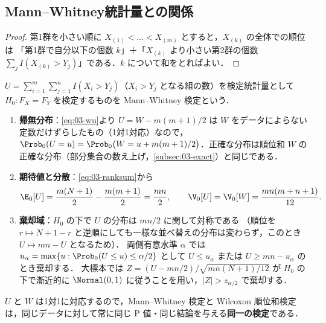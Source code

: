 \subsection{Mann--Whitney統計量との関係}\label{subsec:03-mw}
\begin{proof}
第1群を小さい順に $X_{(1)}<\dots<X_{(m)}$ とすると，$X_{(k)}$ の全体での順位は
「第1群で自分以下の個数 $k$」＋「$X_{(k)}$ より小さい第2群の個数 $\sum_jI(X_{(k)}>Y_j)$」である．$k$ について和をとればよい．
\end{proof}
\begin{teigi}\label{def:03-mwtest}
$U=\sum_{i=1}^m\sum_{j=1}^nI(X_i>Y_j)$（$X_i>Y_j$ となる組の数）を検定統計量として $H_0:F_X=F_Y$ を検定するものを Mann--Whitney 検定という．
\begin{enumerate}[label=(\roman*)]
\item \textbf{帰無分布}：\cref{eq:03-wu}より $U=W-m(m+1)/2$ は $W$ をデータによらない定数だけずらしたもの（1対1対応）なので，
      $\Prob_0(U=u)=\Prob_0\bigl(W=u+m(m+1)/2\bigr)$．正確な分布は順位和 $W$ の正確な分布（部分集合の数え上げ，\cref{subsec:03-exact}）と同じである．
\item \textbf{期待値と分散}：\cref{eq:03-ranksum}から
      \begin{equation}
      \E_0[U]=\frac{m(N+1)}{2}-\frac{m(m+1)}{2}=\frac{mn}{2},\qquad \V_0[U]=\V_0[W]=\frac{mn(m+n+1)}{12}.\label{eq:03-umoments}
      \end{equation}
\item \textbf{棄却域}：$H_0$ の下で $U$ の分布は $mn/2$ に関して対称である
      （順位を $r\mapsto N+1-r$ と逆順にしても一様な並べ替えの分布は変わらず，このとき $U\mapsto mn-U$ となるため）．
      両側有意水準 $\alpha$ では $u_\alpha=\max\{u:\Prob_0(U\le u)\le\alpha/2\}$ として
      $U\le u_\alpha$ または $U\ge mn-u_\alpha$ のとき棄却する．
      大標本では $Z=(U-mn/2)/\sqrt{mn(N+1)/12}$ が $H_0$ の下で漸近的に $\Normal(0,1)$ に従うことを用い，$|Z|>z_{\alpha/2}$ で棄却する．
\end{enumerate}
\end{teigi}
$U$ と $W$ は1対1に対応するので，Mann--Whitney 検定と Wilcoxon 順位和検定は，同じデータに対して常に同じ P 値・同じ結論を与える\textbf{同一の検定}である．

